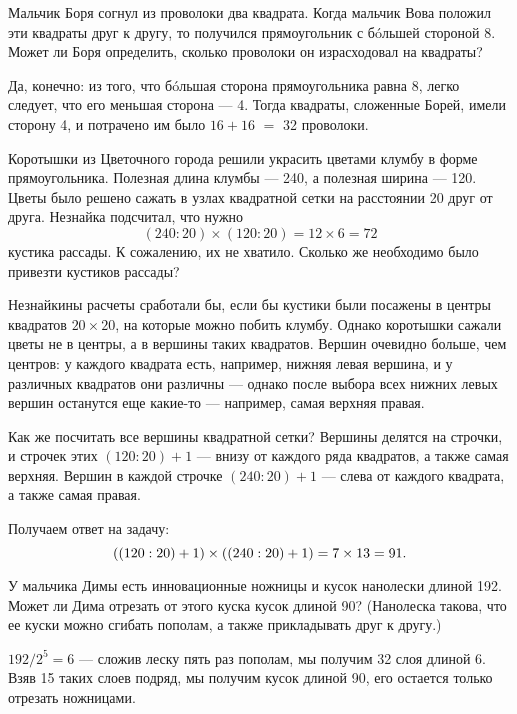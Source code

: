 ﻿


\begin{itemize}

	\itA Мальчик Боря согнул из проволоки два квадрата. Когда мальчик Вова положил эти квадраты друг к другу, то получился прямоугольник с б\'oльшей стороной \SI{8}{}. Может ли Боря определить, сколько проволоки он израсходовал на квадраты?
	
	\itr Да, конечно: из того, что б\'oльшая сторона прямоугольника равна \SI{8}{}, легко следует, что его меньшая сторона — \SI{4}{}. Тогда квадраты, сложенные Борей, имели сторону \SI{4}{}, и потрачено им было $16+16$ $=$ \SI{32}{} проволоки.
	
	\def\cm#1{\SI{#1}{\text{см}}}
	\itB Коротышки из Цветочного города решили украсить цветами клумбу в форме прямоугольника. Полезная длина клумбы — \cm{240}, а полезная ширина — \cm{120}. Цветы было решено сажать в узлах квадратной сетки на расстоянии \cm{20} друг от друга. Незнайка подсчитал, что нужно
	$$(240 : 20) \times (120 : 20) = 12 \times 6 = 72$$
	кустика рассады. К сожалению, их не хватило. Сколько же необходимо было привезти кустиков рассады?
	
	\itr Незнайкины расчеты сработали бы, если бы кустики были посажены в центры квадратов $20 \times 20$, на которые можно побить клумбу. Однако коротышки сажали цветы не в центры, а в вершины таких квадратов. Вершин очевидно больше, чем центров: у каждого квадрата есть, например, нижняя левая вершина, и у различных квадратов они различны — однако после выбора всех нижних левых вершин останутся еще какие-то — например, самая верхняя правая.
	
	Как же посчитать все вершины квадратной сетки? Вершины делятся на строчки, и строчек этих $(120 : 20) +1$ — внизу от каждого ряда квадратов, а также самая верхняя. Вершин в каждой строчке $(240 : 20) +1$ — слева от каждого квадрата, а также самая правая.
	
	Получаем ответ на задачу:
	$$\left(\left(120 : 20\right) +1\right) \times \left(\left(240 : 20\right) +1\right) = 7 \times 13 = 91.$$
	
	\itC У мальчика Димы есть инновационные ножницы и кусок нанолески длиной \cm{192}. Может ли Дима отрезать от этого куска кусок длиной \cm{90}? (Нанолеска такова, что ее куски можно сгибать пополам, а также прикладывать друг к другу.)
	
	\itr $192 / 2^5 = 6$ — сложив леску пять раз пополам, мы получим 32 слоя длиной \cm{6}. Взяв 15 таких слоев подряд, мы получим кусок длиной \cm{90}, его остается только отрезать ножницами.

\end{itemize}

